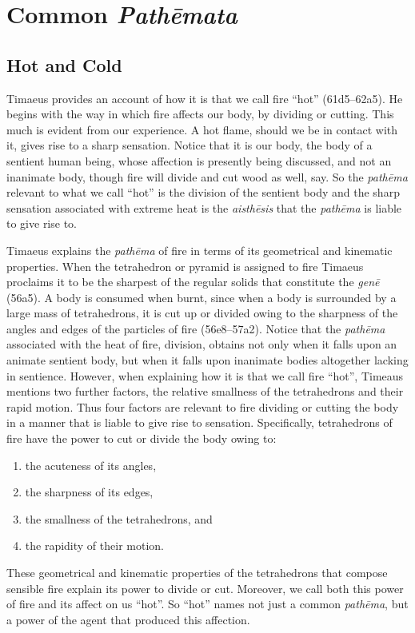 
\section{Common \emph{Pathēmata}} %
\label{sec:common_emph_pathemata}

\subsection{Hot and Cold} %
\label{sub:hot_and_cold}

Timaeus provides an account of how it is that we call fire ``hot'' (61d5--62a5). He begins with the way in which fire affects our body, by dividing or cutting. This much is evident from our experience. A hot flame, should we be in contact with it, gives rise to a sharp sensation. Notice that it is our body, the body of a sentient human being, whose affection is presently being discussed, and not an inanimate body, though fire will divide and cut wood as well, say. So the \emph{pathēma} relevant to what we call ``hot'' is the division of the sentient body and the sharp sensation associated with extreme heat is the \emph{aisthēsis} that the \emph{pathēma} is liable to give rise to. 

Timaeus explains the \emph{pathēma} of fire in terms of its geometrical and kinematic properties. When the tetrahedron or pyramid is assigned to fire Timaeus proclaims it to be the sharpest of the regular solids that constitute the \emph{genē} (56a5). A body is consumed when burnt, since when a body is surrounded by a large mass of tetrahedrons, it is cut up or divided owing to the sharpness of the angles and edges of the particles of fire (56e8--57a2). Notice that the \emph{pathēma} associated with the heat of fire, division, obtains not only when it falls upon an animate sentient body, but when it falls upon inanimate bodies altogether lacking in sentience. However, when explaining how it is that we call fire ``hot'', Timeaus mentions two further factors, the relative smallness of the tetrahedrons and their rapid motion. Thus four factors are relevant to fire dividing or cutting the body in a manner that is liable to give rise to sensation. Specifically, tetrahedrons of fire have the power to cut or divide the body owing to:
\begin{enumerate}
	\item the acuteness of its angles,
	\item the sharpness of its edges,
	\item the smallness of the tetrahedrons, and
	\item the rapidity of their motion.
\end{enumerate}
These geometrical and kinematic properties of the tetrahedrons that compose sensible fire explain its power to divide or cut. Moreover, we call both this power of fire and its affect on us ``hot''. So ``hot'' names not just a common \emph{pathēma}, but a power of the agent that produced this affection. 

